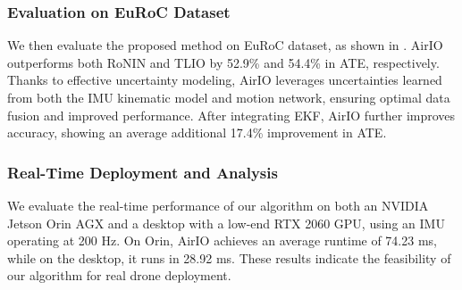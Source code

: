 


\subsubsection{Evaluation on EuRoC Dataset}
We then evaluate the proposed method on EuRoC dataset, as shown in . AirIO outperforms both RoNIN and TLIO by 52.9\% and 54.4\% in ATE, respectively. Thanks to effective uncertainty modeling, AirIO leverages uncertainties learned from both the IMU kinematic model and motion network, ensuring optimal data fusion and improved performance.
After integrating EKF, AirIO further improves accuracy, showing an average additional 17.4\% improvement in ATE.



\subsubsection{Real-Time Deployment and Analysis}
We evaluate the real-time performance of our algorithm on both an NVIDIA Jetson Orin AGX and a desktop with a low-end RTX 2060 GPU, using an IMU operating at 200 Hz. On Orin, AirIO achieves an average runtime of 74.23 ms, while on the desktop, it runs in 28.92 ms. These results indicate the feasibility of our algorithm for real drone deployment.


